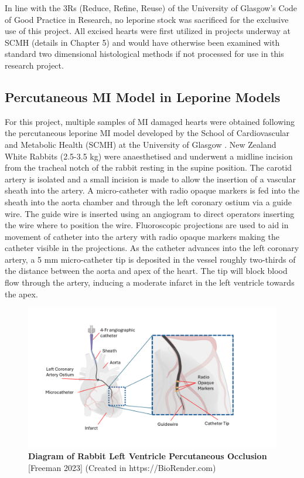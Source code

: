 In line with the 3Rs (Reduce, Refine, Reuse) of the University of Glasgow's Code of Good Practice in Research, no leporine stock was sacrificed for the exclusive use of this project. All excised hearts were first utilized in projects underway at SCMH (details in Chapter 5) and would have otherwise been examined with standard two dimensional histological methods if not processed for use in this research project.


\subsection{Percutaneous MI Model in Leporine Models}
For this project, multiple samples of MI damaged hearts were obtained following the percutaneous leporine MI model developed by the School of Cardiovascular and Metabolic Health (SCMH) at the University of Glasgow \cite{freeman_novel_2024}. New Zealand White Rabbits (2.5-3.5 kg) were anaesthetised and underwent a midline incision from the tracheal notch of the rabbit resting in the supine position. The carotid artery is isolated and a small incision is made to allow the insertion of a vascular sheath into the artery. A micro-catheter with radio opaque markers is fed into the sheath into the aorta chamber and through the left coronary ostium via a guide wire. The guide wire is inserted using an angiogram to direct operators inserting the wire where to position the wire. Fluoroscopic projections are used to aid in movement of catheter into the artery with radio opaque markers making the catheter visible in the projections. As the catheter advances into the left coronary artery, a 5 mm micro-catheter tip is deposited in the vessel roughly two-thirds of the distance between the aorta and apex of the heart. The tip will block blood flow through the artery, inducing a moderate infarct in the left ventricle towards the apex.  

\begin{figure}[H]
    \centering
    \includegraphics[width=1\linewidth]{Figures/Figure2_2.png}
    \caption{\textbf{Diagram of Rabbit Left Ventricle Percutaneous Occlusion} [Freeman 2023] (Created in  https://BioRender.com)}
    \label{fig:enter-label}
\end{figure}


